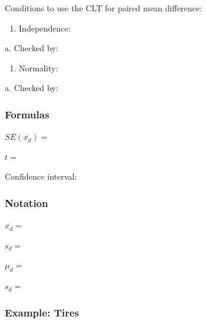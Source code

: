 \documentclass[
]{report}
\providecommand{\tightlist}{%
  \setlength{\itemsep}{0pt}\setlength{\parskip}{0pt}}
\newcommand{\rgs}{\vspace{12pt}} %
\newcommand{\rgi}{\hspace{24pt}}  %
\begin{document}
Conditions to use the CLT for paired mean difference:

\begin{enumerate}
\def\labelenumi{\arabic{enumi}.}
\tightlist
\item
  Independence:
  \rgs
\end{enumerate}

\rgi a. Checked by:
\rgs 

\begin{enumerate}
\def\labelenumi{\arabic{enumi}.}
\setcounter{enumi}{1}
\tightlist
\item
  Normality:
  \rgs
\end{enumerate}

\rgi a. Checked by:
\rgs

\hypertarget{formulas-9}{%
\subsubsection*{Formulas}\label{formulas-9}}

\(SE(\overline{x_d})=\)
\rgs

\(t=\)
\rgs

Confidence interval:
\rgs

\hypertarget{notation-2}{%
\subsubsection*{Notation}\label{notation-2}}

\(\overline{x_d}=\)
\rgs

\(s_d=\)
\rgs

\(\mu_d=\)
\rgs

\(s_d=\)
\rgs

\hypertarget{example-tires}{%
\subsubsection*{Example: Tires}\label{example-tires}}
\end{document}
